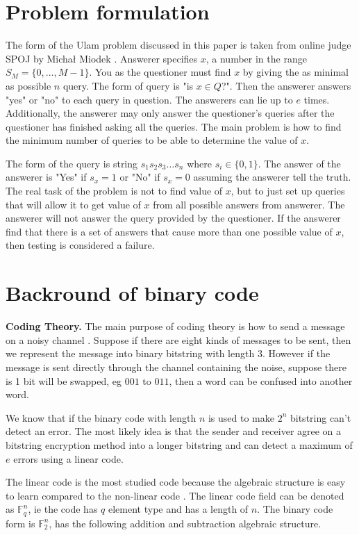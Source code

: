 \documentclass{TTP_DSL2006}
\begin{document}
\section{Problem formulation}

The form of the Ulam problem discussed in this paper is taken from online judge SPOJ by Micha\l{} Miodek \cite{guessn5}. Answerer specifies $x$, a number in the range $S_M = \{0, \ldots, M-1 \}$. You as the questioner must find $x$ by giving the as minimal as possible $n$ query. The form of query is "is $x \in Q$?". Then the answerer answers "yes" or "no" to each query in question. The answerers can lie up to $e$ times. Additionally, the answerer may only answer the questioner's queries after the questioner has finished asking all the queries. The main problem is how to find the minimum number of queries to be able to determine the value of $x$.

The form of the query is string $s_1s_2s_3\ldots s_n$ where $s_i \in \{0,1\}$. The answer of the answerer is "Yes" if $s_x = 1$ or "No" if $s_x = 0$ assuming the answerer tell the truth. The real task of the problem is not to find value of $x$, but to just set up queries that will allow it to get value of $x$ from all possible answers from answerer. The answerer will not answer the query provided by the questioner. If the answerer find that there is a set of answers that cause more than one possible value of $x$, then testing is considered a failure.


\section{Backround of binary code}

\noindent \textbf{Coding Theory.}
The main purpose of coding theory is how to send a message on a noisy channel \cite{VanLint2016}. Suppose if there are eight kinds of messages to be sent, then we represent the message into binary bitstring with length 3. However if the message is sent directly through the channel containing the noise, suppose there is 1 bit will be swapped, eg $001$ to $011$, then a word can be confused into another word.

We know that if the binary code with length $n$ is used to make $2^n$ bitstring can't detect an error. The most likely idea is that the sender and receiver agree on a bitstring encryption method into a longer bitstring and can detect a maximum of $e$ errors using a linear code.

The linear code is the most studied code because the algebraic structure is easy to learn compared to the non-linear code \cite{Huffman}. The linear code field can be denoted as $\mathbb{F}_q^n$, ie the code has $q$ element type and has a length of $n$. The binary code form is $\mathbb{F}_2^n $, has the following addition and subtraction algebraic structure.
\end{document}
